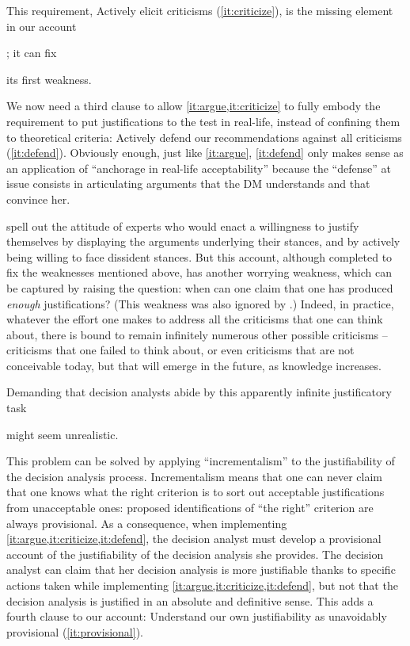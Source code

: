 \documentclass[preprint, french, english, 11pt, authoryear]{elsarticle}%
\begin{document}
This requirement, Actively elicit criticisms (\ref{it:criticize}), is the missing element in our account\begin{changebar}; it can fix\end{changebar} its first weakness.

We now need a third clause to allow \cref{it:argue,it:criticize} to fully embody the requirement to put justifications to the test in real-life, instead of confining them to theoretical criteria: Actively defend our recommendations against all criticisms (\ref{it:defend}).
Obviously enough, just like \cref{it:argue}, \cref{it:defend} only makes sense as an application of ``anchorage in real-life acceptability'' because the ``defense'' at issue consists in articulating arguments that the \ac{DM} understands and that convince her.

 spell out the attitude of experts who would enact a willingness to justify themselves by displaying the arguments underlying their stances, and by actively being willing to face dissident stances. 
But this account, although completed to fix the weaknesses mentioned above, has another worrying weakness, which can be captured by raising the question: when can one claim that one has produced \emph{enough} justifications? (This weakness was also ignored by  \citet{meinard_what_2017}.) 
Indeed, in practice, whatever the effort one makes to address all the criticisms that one can think about, there is bound to remain infinitely numerous other possible criticisms -- criticisms that one failed to think about, or even criticisms that are not conceivable today, but that will emerge in the future, as knowledge increases. 
\begin{changebar}Demanding that decision analysts abide by this apparently infinite justificatory task\end{changebar} might seem unrealistic.

This problem can be solved by applying ``incrementalism'' to the justifiability of the decision analysis process. 
Incrementalism means that one can never claim that one knows what the right criterion is to sort out acceptable justifications from unacceptable ones: proposed identifications of ``the right'' criterion are always provisional. 
As a consequence, when implementing \cref{it:argue,it:criticize,it:defend}, the decision analyst must develop a provisional account of the justifiability of the decision analysis she provides. 
The decision analyst can claim that her decision analysis is more justifiable thanks to specific actions taken while implementing \cref{it:argue,it:criticize,it:defend}, but not that the decision analysis is justified in an absolute and definitive sense. 
This adds a fourth clause to our account: Understand our own justifiability as unavoidably provisional (\ref{it:provisional}).
\end{document}
